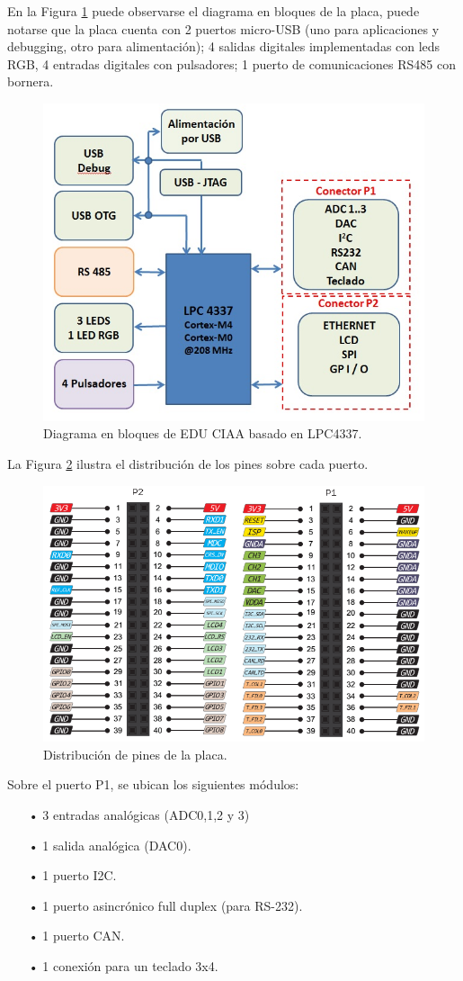 \documentclass[12pt,letterpaper]{article}
\begin{document}
En la Figura  \ref{diagramaenbloques} puede observarse el diagrama en bloques de la placa, puede notarse que la placa cuenta con 2 puertos micro-USB (uno para aplicaciones y debugging, otro para alimentación); 4 salidas digitales implementadas con leds RGB, 4 entradas digitales con pulsadores; 1 puerto de comunicaciones RS485 con bornera. 
\begin{figure}[H]
\centering
\includegraphics[width=8 cm]{figuras/diagramaenbloques.jpg}
\caption{Diagrama en bloques de EDU CIAA basado en LPC4337.}
\label{diagramaenbloques}
\end{figure}
La Figura  \ref{distribucionpines} ilustra el distribución de los pines sobre cada puerto.
\begin{figure}[H]
\centering
\includegraphics[width=8 cm]{figuras/f16.png}
\caption{Distribución de pines de la placa.}
\label{distribucionpines}
\end{figure} 
Sobre el puerto P1, se ubican los siguientes módulos:

\begin{enumerate}
\item[•] 3 entradas analógicas (ADC0,1,2 y 3)
\item[•] 1 salida analógica (DAC0).
\item[•] 1 puerto I2C.
\item[•] 1 puerto asincrónico full duplex (para RS-232).
\item[•] 1 puerto CAN.
\item[•] 1 conexión para un teclado 3x4.
\end{enumerate}
\end{document}
